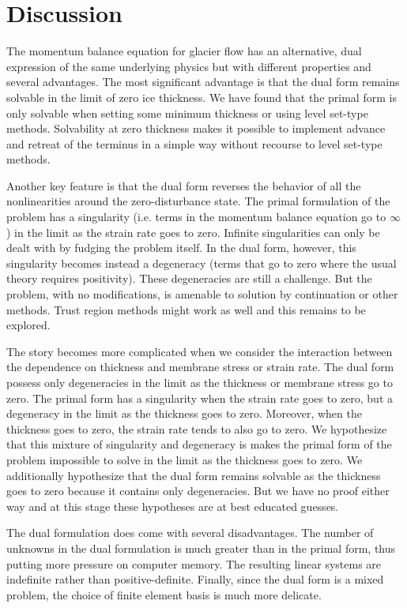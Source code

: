 \documentclass[twocolumn,letterpaper]{igs}
\begin{document}
\section{Discussion}

The momentum balance equation for glacier flow has an alternative, dual expression of the same underlying physics but with different properties and several advantages.
The most significant advantage is that the dual form remains solvable in the limit of zero ice thickness.
We have found that the primal form is only solvable when setting some minimum thickness or using level set-type methods.
Solvability at zero thickness makes it possible to implement advance and retreat of the terminus in a simple way without recourse to level set-type methods.

Another key feature is that the dual form reverses the behavior of all the nonlinearities around the zero-disturbance state.
The primal formulation of the problem has a singularity (i.e. terms in the momentum balance equation go to $\infty$) in the limit as the strain rate goes to zero.
Infinite singularities can only be dealt with by fudging the problem itself.
In the dual form, however, this singularity becomes instead a degeneracy (terms that go to zero where the usual theory requires positivity).
These degeneracies are still a challenge.
But the problem, with no modifications, is amenable to solution by continuation or other methods.
Trust region methods might work as well and this remains to be explored.

The story becomes more complicated when we consider the interaction between the dependence on thickness and membrane stress or strain rate.
The dual form possess only degeneracies in the limit as the thickness or membrane stress go to zero.
The primal form has a singularity when the strain rate goes to zero, but a degeneracy in the limit as the thickness goes to zero.
Moreover, when the thickness goes to zero, the strain rate tends to also go to zero.
We hypothesize that this mixture of singularity and degeneracy is makes the primal form of the problem impossible to solve in the limit as the thickness goes to zero.
We additionally hypothesize that the dual form remains solvable as the thickness goes to zero because it contains only degeneracies.
But we have no proof either way and at this stage these hypotheses are at best educated guesses.

The dual formulation does come with several disadvantages.
The number of unknowns in the dual formulation is much greater than in the primal form, thus putting more pressure on computer memory.
The resulting linear systems are indefinite rather than positive-definite.
Finally, since the dual form is a mixed problem, the choice of finite element basis is much more delicate.
\end{document}
